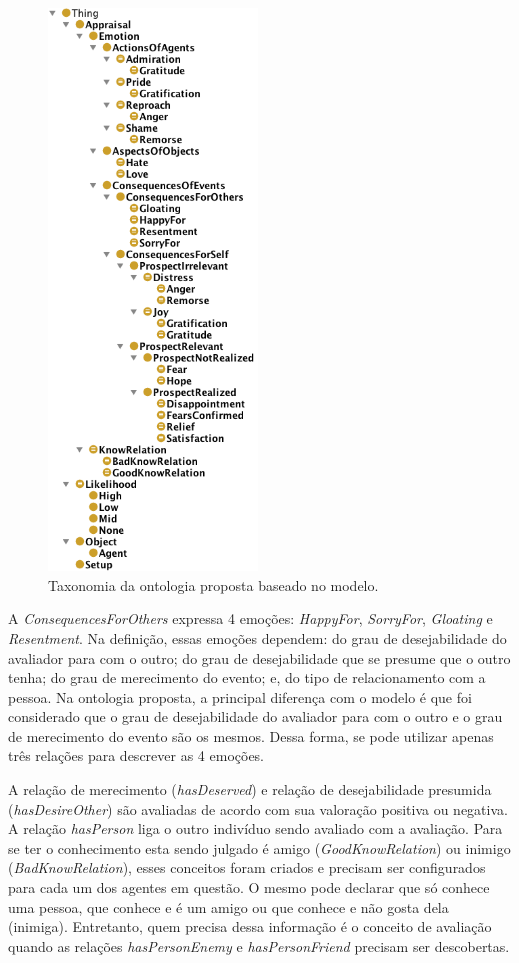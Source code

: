 \begin{figure}
  \includegraphics[height=149mm]{figuras/hierarquiaLOCC.png}
  \caption{Taxonomia da ontologia proposta baseado no modelo.}
  \label{fig:tlocc}
\end{figure}

A \emph{ConsequencesForOthers} expressa 4 emoções: \emph{HappyFor},
\emph{SorryFor}, \emph{Gloating} e \emph{Resentment}. Na definição, essas
emoções dependem: do grau de desejabilidade do avaliador para com o outro; do
grau de desejabilidade que se presume que o outro tenha; do grau de
merecimento do evento; e, do tipo de relacionamento com a pessoa. Na ontologia
proposta, a principal diferença com o modelo \occ é que foi considerado
que o grau de desejabilidade do avaliador para com o outro e o grau de
merecimento do evento são os mesmos. Dessa forma, se pode utilizar apenas três
relações para descrever as 4 emoções.

A relação de merecimento (\emph{hasDeserved}) e relação de desejabilidade
presumida (\emph{hasDesireOther}) são avaliadas de acordo com sua valoração
positiva ou negativa. A relação \emph{hasPerson} liga o outro indivíduo
sendo avaliado com a avaliação. Para se ter o conhecimento esta sendo julgado
é amigo (\emph{GoodKnowRelation}) ou inimigo (\emph{BadKnowRelation}), esses
conceitos foram criados e precisam ser configurados para cada um dos agentes
em questão. O mesmo pode declarar que só conhece uma pessoa, que conhece e é
um amigo ou que conhece e não gosta dela (inimiga). Entretanto, quem precisa
dessa informação é o conceito de avaliação quando as relações
\emph{hasPersonEnemy} e \emph{hasPersonFriend} precisam ser descobertas.

